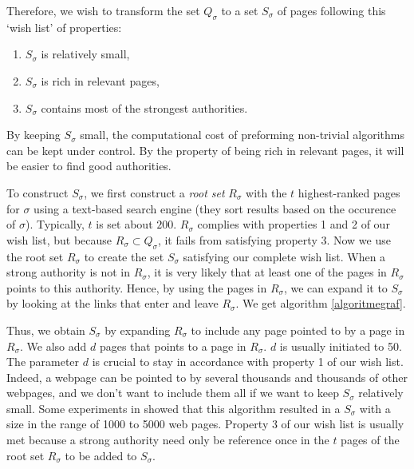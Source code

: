 \documentclass[a4paper,11pt]{report}
\begin{document}
Therefore, we wish to transform the set $Q_\sigma$ to a set $S_\sigma$ of pages following 
this `wish list' of properties:
\begin{enumerate}
  \item $S_\sigma$ is relatively small,
  \item $S_\sigma$ is rich in relevant pages,
  \item$S_\sigma$ contains most of the strongest authorities.
\end{enumerate}
By keeping $S_\sigma$ small, the computational cost of preforming 
non-trivial algorithms can be kept under control. By the property of being rich 
in relevant pages, it will be easier to find good authorities. 

To construct $S_\sigma$, we first construct a \emph{root set} $R_\sigma$ with the $t$ highest-ranked pages for $\sigma$ 
using a text-based search engine (they sort results based on the occurence of 
$\sigma$). Typically, $t$ is set about $200$. $R_\sigma$ complies with properties 1 and 2 
of our wish list, but because $R_\sigma \subset Q_\sigma$, it fails from satisfying 
property 3. Now we use the root set $R_\sigma$ to create the set $S_\sigma$ satisfying our 
complete wish list. When a strong authority is not in $R_\sigma$, it is very 
likely that at least one of the pages in $R_\sigma$ points to this authority. 
Hence, by using the pages in $R_\sigma$, we can expand it to $S_\sigma$ by looking 
at the links that enter and leave $R_\sigma$. We get algorithm \ref{algoritmegraf}.

Thus, we obtain $S_\sigma$ by expanding
$R_\sigma$ to include any page pointed to by a page in $R_\sigma$. We also add $d$ pages that points
to a page in $R_\sigma$. $d$ is usually initiated to 50. The parameter $d$ is 
crucial to stay in accordance with property 1 of our wish list. Indeed, a 
webpage can be pointed to by several thousands and thousands of other webpages, 
and we don't want to include them all if we want to keep $S_\sigma$ relatively 
small. Some experiments in \cite{kleinberg} showed that this algorithm resulted in a $S_\sigma$ 
with a size in the range of 1000 to 5000 web pages. Property 3 of our wish list is usually met 
because a strong authority need only be reference once in the $t$ pages of the 
root set $R_\sigma$ to be added to $S_\sigma$. 
\end{document}
